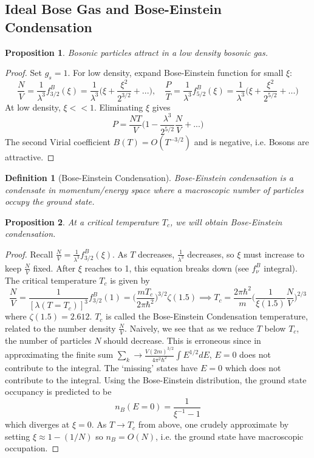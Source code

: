 \documentclass[a4paper]{article}
\theoremstyle{new}
\newtheorem{defi}{Definition}[section]
\newtheorem{prop}{Proposition}[section]
\begin{document}
\subsection{Ideal Bose Gas and Bose-Einstein Condensation}
\begin{prop}
Bosonic particles attract in a low density bosonic gas.
\end{prop}
\begin{proof}
Set $g_s=1$. For low density, expand Bose-Einstein function for small $\xi$:
$$\frac{N}{V}=\frac{1}{\lambda^3}f_{3/2}^B(\xi)=\frac{1}{\lambda^3}\bigg(\xi+\frac{\xi^2}{2^{3/2}}+...\bigg),\quad \frac{P}{T}=\frac{1}{\lambda^3}f_{5/2}^B(\xi)=\frac{1}{\lambda^3}\bigg(\xi+\frac{\xi^2}{2^{5/2}}+...\bigg)$$
At low density, $\xi<<1$. Eliminating $\xi$ gives
$$P=\frac{NT}{V}\bigg(1-\frac{\lambda^3}{2^{5/2}}\frac{N}{V}+...\bigg)$$
The second Virial coefficient $B(T)=O(T^{-3/2})$ and is negative, i.e. Bosons are attractive.
\end{proof}
\begin{defi}[Bose-Einstein Condensation]
Bose-Einstein condensation is a condensate in momentum/energy space where a macroscopic number of particles occupy the ground state.
\end{defi}
\begin{prop}
At a critical temperature $T_c$, we will obtain Bose-Einstein condensation.
\end{prop}
\begin{proof}
Recall $\frac{N}{V}=\frac{1}{\lambda^3}f_{3/2}^B(\xi)$. As $T$ decreases, $\frac{1}{\lambda^3}$ decreases, so $\xi$ must increase to keep $\frac{N}{V}$ fixed. After $\xi$ reaches to 1, this equation breaks down (see $f_\nu^B$ integral). The critical temperature $T_c$ is given by
$$\frac{N}{V}=\frac{1}{[\lambda(T=T_c)]^3}f_{3/2}^B(1)=\bigg(\frac{mT_c}{2\pi\hbar^2}\bigg)^{3/2}\zeta(1.5)\implies T_c=\frac{2\pi\hbar^2}{m}\bigg(\frac{1}{\xi(1.5)}\frac{N}{V}\bigg)^{2/3}$$
where $\zeta(1.5)=2.612$. $T_c$ is called the Bose-Einstein Condensation temperature, related to the number density $\frac{N}{V}$. Naively, we see that as we reduce $T$ below $T_c$, the number of particles $N$ should decrease. This is erroneous since in approximating the finite sum $\sum_k\rightarrow\frac{V(2m)^{3/2}}{4\pi^2\hbar^2}\int E^{1/2}dE$, $E=0$ does not contribute to the integral. The `missing' states have $E=0$ which does not contribute to the integral. Using the Bose-Einstein distribution, the ground state occupancy is predicted to be
$$n_B(E=0)=\frac{1}{\xi^{-1}-1}$$
which diverges at $\xi=0$. As $T\rightarrow T_c$ from above, one crudely approximate by setting $\xi\approx1-(1/N)$ so $n_B=O(N)$, i.e. the ground state have macroscopic occupation. 
\end{proof}
\end{document}
